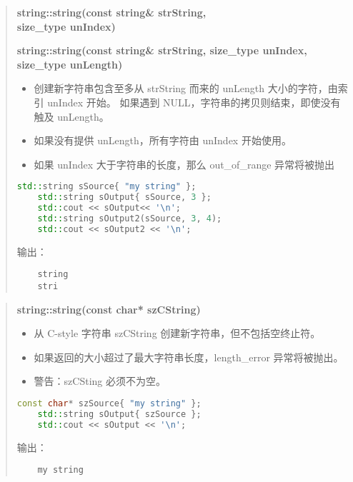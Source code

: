 \documentclass[../../LearnCpp.tex]{subfiles}
\begin{document}
\begin{quotation}

  \textbf{string::string(const string\& strString, \\ size\_type unIndex)}

  \textbf{string::string(const string\& strString, size\_type unIndex, size\_type unLength)}

  \begin{itemize}
    \item 创建新字符串包含至多从 strString 而来的 unLength 大小的字符，由索引 unIndex 开始。
          如果遇到 NULL，字符串的拷贝则结束，即使没有触及 unLength。
    \item 如果没有提供 unLength，所有字符由 unIndex 开始使用。
    \item 如果 unIndex 大于字符串的长度，那么 out\_of\_range 异常将被抛出
  \end{itemize}

  \begin{lstlisting}[language=C++]
    std::string sSource{ "my string" };
    std::string sOutput{ sSource, 3 };
    std::cout << sOutput<< '\n';
    std::string sOutput2(sSource, 3, 4);
    std::cout << sOutput2 << '\n';
    \end{lstlisting}

  输出：

  \begin{lstlisting}
    string
    stri
    \end{lstlisting}
\end{quotation}

\begin{quotation}
  \textbf{string::string(const char* szCString)}

  \begin{itemize}
    \item 从 C-style 字符串 szCString 创建新字符串，但不包括空终止符。
    \item 如果返回的大小超过了最大字符串长度，length\_error 异常将被抛出。
    \item 警告：szCSting 必须不为空。
  \end{itemize}

  \begin{lstlisting}[language=C++]
    const char* szSource{ "my string" };
    std::string sOutput{ szSource };
    std::cout << sOutput << '\n';
    \end{lstlisting}

  输出：

  \begin{lstlisting}
    my string
    \end{lstlisting}
\end{quotation}
\end{document}
